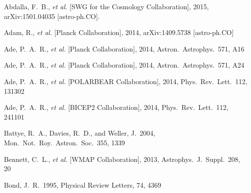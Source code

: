 \begin{thebibliography}{99}
\begin{multicols}{2}{\footnotesize


  Abdalla, F.~B., {\it et al.}  [SWG for the Cosmology Collaboration], 2015,
  arXiv:1501.04035 [astro-ph.CO].

  Adam, R., {\it et al.}  [Planck Collaboration], 2014,
  arXiv:1409.5738 [astro-ph.CO]

  Ade, P.~A.~R., {\it et al.}  [Planck Collaboration], 2014,
  Astron.\ Astrophys.\ 571, A16

  Ade, P.~A.~R., {\it et al.}  [Planck Collaboration], 2014,
  Astron.\ Astrophys.\  571, A24

  Ade, P.~A.~R., {\it et al.}  [POLARBEAR Collaboration], 2014,
  Phys.\ Rev.\ Lett.\  112, 131302

  Ade, P.~A.~R., {\it et al.}  [BICEP2 Collaboration], 2014,
  Phys.\ Rev.\ Lett.\  112, 241101


  Battye, R.~A., Davies, R.~D., and Weller, J.\ 2004,
  Mon.\ Not.\ Roy.\ Astron.\ Soc.\  355, 1339

  Bennett, C.~L., {\it et al.}  [WMAP Collaboration], 2013,
  Astrophys.\ J.\ Suppl.\  208, 20

 Bond, J.~R.\ 1995, Physical 
Review Letters, 74, 4369 

}
\end{multicols}
\end{thebibliography}

